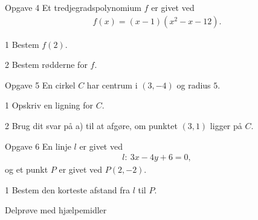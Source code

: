 \begin{opgavetekst}{Opgave 4}
	Et tredjegradspolynomium $f$ er givet ved
	\begin{align*}
		f(x) = (x-1)(x^2-x-12).
	\end{align*}
\end{opgavetekst}
\begin{delopgave}{}{1}
	Bestem $f(2)$.
\end{delopgave}
\begin{delopgave}{}{2}
	Bestem rødderne for $f$. 
\end{delopgave}
\newpage
\begin{opgavetekst}{Opgave 5}
	En cirkel $C$ har centrum i $(3,-4)$ og radius $5$.
\end{opgavetekst}
\begin{delopgave}{}{1}
	Opskriv en ligning for $C$.
\end{delopgave}
\begin{delopgave}{}{2}
	Brug dit svar på a) til at afgøre, om punktet $(3,1)$ ligger på $C$.
\end{delopgave}
\begin{opgavetekst}{Opgave 6}
	En linje $l$ er givet ved
	\begin{align*}
		l: \ 3x -4y + 6 = 0,
	\end{align*}
	og et punkt $P$ er givet ved $P(2,-2)$.
\end{opgavetekst}
\begin{delopgave}{}{1}
	Bestem den korteste afstand fra $l$ til $P$. 
\end{delopgave}
\newpage
\begin{center}
\LARGE
Delprøve med hjælpemidler 
\end{center}
